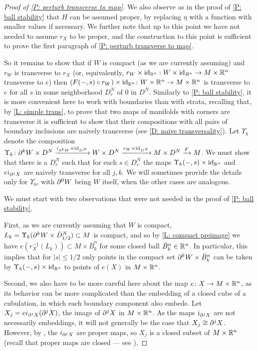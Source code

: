 \begin{proof}[Proof of \cref{P: perturb transverse to map}]
	We also observe as in the proof of \cref{P: ball stability} that $H$ can be assumed proper, by replacing $\eta$ with a function with smaller values if necessary.
	We further note that up to this point we have not needed to assume $r_X$ to be proper, and the construction to this point is sufficient to prove the first paragraph of \cref{P: perturb transverse to map}.

 	So it remains to show that if $W$ is compact (as we are currently assuming) and $r_W$ is transverse to $r_X$ (or, equivalently, $r_W \times \mathrm{id}_{\mathbb{R}^n}: W \times \mathrm{id}_{R^n} \to M \times \mathbb{R}^n$ transverse to $e$) then $(F(-,s) \circ r_W) \times \mathrm{id}_{\mathbb{R}^n} \colon W \times \mathbb{R}^n \to M \times \mathbb{R}^n$ is transverse to $e$ for all $s$ in some neighborhood $D_r^N$ of $0$ in $D^N$.
	Similarly to \cref{P: ball stability}, it is more convenient here to work with boundaries than with strata, recalling that, by \cref{L: simple trans}, to prove that two maps of manifolds with corners are transverse it is sufficient to show that their compositions with all pairs of boundary inclusions are naively transverse (see \cref{D: naive transversality}).
	Let $\Upsilon_k$ denote the composition $\Upsilon_k \colon \partial^k W \times D^N \xrightarrow{i_{\partial^k W} \times \mathrm{id}_{D^N}} W \times D^N \xrightarrow{r_W \times \mathrm{id}_{D^N}} M \times D^N \xrightarrow{F} M$.
	We must show that there is a $D_r^N$ such that for each $s\in D_r^N$ the maps $\Upsilon_k(-,s) \times \mathrm{id}_{\mathbb{R}^n}$ and $e i_{\partial^jX}$ are naively transverse for all $j,k$.
	We will sometimes provide the details only for $\Upsilon_0$, with $\partial^0 W$ being $W$ itself, when the other cases are analogous.

	We must start with two observations that were not needed in the proof of \cref{P: ball stability}.

	First, as we are currently assuming that $W$ is compact, $L_k = \Upsilon_k(\partial^k W \times \bar D^N_{1/2}) \subset M$ is compact, and so by \cref{L: compact preimage} we have $e(r_X^{-1}(L_k)) \subset M \times \bar B^n_k$ for some closed ball $\bar B^n_k \in \mathbb{R}^n$.
	In particular, this implies that for $|s| \leq 1/2$ only points in the compact set $\partial^k W \times \bar B^n_k$ can be taken by $\Upsilon_k(-,s) \times \mathrm{id}_{\mathbb{R}^n}$ to points of $e(X)$ in $M \times \mathbb{R}^n$.

	Second, we also have to be more careful here about the map $e \colon X \to M \times \mathbb{R}^n$, as its behavior can be more complicated than the embedding of a closed cube of a cubulation, in which each boundary component also embeds.
	Let $X_j = ei_{\partial^jX}(\partial^jX)$, the image of $\partial^jX$ in $M \times \mathbb{R}^n$.
	As the maps $i_{\partial^jX}$ are not necessarily embeddings, it will not generally be the case that $X_j \cong \partial^jX$.
	However, by \cite[Lemma 2.8]{Joy12}, the $i_{\partial^jX}$ are proper maps, so $X_j$ is a closed subset of $M \times \mathbb{R}^n$ (recall that proper maps are closed --- see \cite[Proposition I.10.1.1]{Bou98}).


\end{proof}
